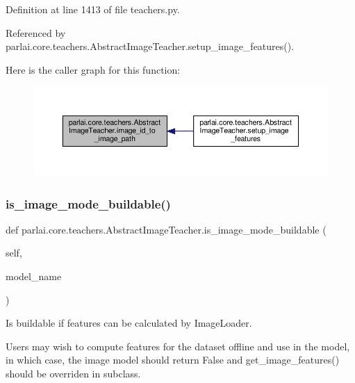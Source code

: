 Definition at line 1413 of file teachers.\+py.



Referenced by parlai.\+core.\+teachers.\+Abstract\+Image\+Teacher.\+setup\+\_\+image\+\_\+features().

Here is the caller graph for this function\+:
\nopagebreak
\begin{figure}[H]
\begin{center}
\leavevmode
\includegraphics[width=350pt]{classparlai_1_1core_1_1teachers_1_1AbstractImageTeacher_aa75286450850638274d7f076a81f7e90_icgraph}
\end{center}
\end{figure}
\mbox{\label{classparlai_1_1core_1_1teachers_1_1AbstractImageTeacher_a16c2be0ffe61e136dea2a63cbd918af5}} 
\subsubsection{\texorpdfstring{is\+\_\+image\+\_\+mode\+\_\+buildable()}{is\_image\_mode\_buildable()}}
{\footnotesize\ttfamily def parlai.\+core.\+teachers.\+Abstract\+Image\+Teacher.\+is\+\_\+image\+\_\+mode\+\_\+buildable (\begin{DoxyParamCaption}\item[{}]{self,  }\item[{}]{model\+\_\+name }\end{DoxyParamCaption})}

\begin{DoxyVerb}Is buildable if features can be calculated by ImageLoader.

Users may wish to compute features for the dataset offline and use in
the model, in which case, the image model should return False and
get_image_features() should be overriden in subclass.
\end{DoxyVerb}
 

